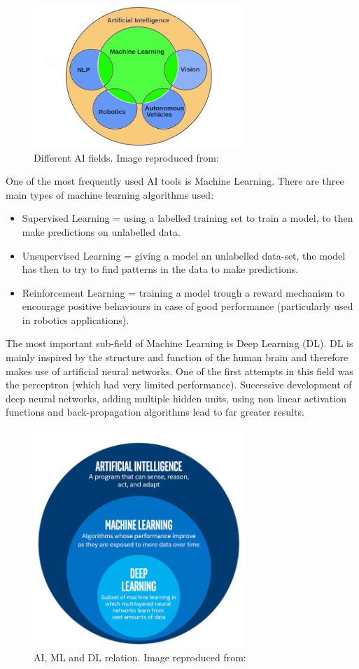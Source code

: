 \begin{figure}[ht!]%
    \centering
    \includegraphics[width=8cm]{images/AI.png}%
    \caption{Different AI fields. Image reproduced from: \cite{AI}}
\end{figure}

One of the most frequently used AI tools is Machine Learning. There are three main types of machine learning algorithms used: 
\begin{itemize}
\itemsep0em
\item Supervised Learning = using a labelled training set to train a model, to then make predictions on unlabelled data. 
\item Unsupervised Learning = giving a model an unlabelled data-set, the model has then to try to find patterns in the data to make predictions. 
\item Reinforcement Learning = training a model trough a reward mechanism to encourage positive behaviours in case of good performance (particularly used in robotics applications).
\end{itemize}

The most important sub-field of Machine Learning is Deep Learning (DL). DL is mainly inspired by the structure and function of the human brain and therefore makes use of artificial neural networks. One of the first attempts in this field was the perceptron (which had very limited performance). Successive development of deep neural networks, adding multiple hidden units, using non linear activation functions and back-propagation algorithms lead to far greater results. 

\begin{figure}[ht!]%
    \centering
    \includegraphics[width=8cm]{images/DL.png}%
    \caption{AI, ML and DL relation. Image reproduced from: \cite{DL}}
\end{figure}

